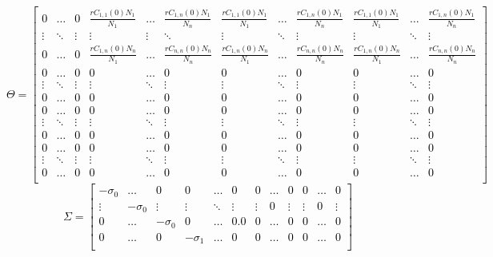 \documentclass[10pt,onecolumn,twoside,lineno]{pnas-new}
\begin{document}
\textcolor{black}{
\begin{equation}
    \Theta = 
\begin{bmatrix}
0 & \dots & 0  & \frac{r C_{1,1}(0)N_1}{N_1} & \dots &\frac{r C_{1,n}(0)N_1}{N_n} &  \frac{r C_{1,1}(0)N_1}{N_1} & \dots & \frac{r C_{1,n}(0)N_1}{N_n} &  \frac{r C_{1,1}(0)N_1}{N_1} & \dots & \frac{r C_{1,n}(0)N_1}{N_n}  \\
\vdots & \ddots  & \vdots & \vdots & \vdots & \ddots  & \vdots & \ddots & \vdots  & \vdots & \ddots & \vdots \\
0 & \dots & 0 & \frac{r C_{1,n}(0)N_n}{N_1} & \dots & \frac{r C_{n,n}(0)N_n}{N_n}  & \frac{ r C_{1,n}(0)N_n}{N_1} & \dots & \frac{r C_{n,n}(0)N_n}{N_n} & \frac{ r C_{1,n}(0)N_n}{N_1} & \dots & \frac{r C_{n,n}(0)N_n}{N_n} \\ 
0 & \dots & 0  & 0 & \dots & 0  & 0 & \dots & 0 & 0 & \dots & 0  \\
\vdots & \ddots & \vdots & \vdots &  \ddots & \vdots & \vdots & \ddots & \vdots & \vdots & \ddots & \vdots\\
0 & \dots & 0  & 0 & \dots &  0  & 0 & \dots & 0  & 0 & \dots & 0 \\ 
0 & \dots & 0  &  0 & \dots & 0  & 0 & \dots & 0  & 0 & \dots & 0 \\
\vdots & \ddots & \vdots & \vdots & \ddots & \vdots & \vdots & \ddots & \vdots  & \vdots & \ddots & \vdots\\
0 & \dots & 0  & 0 & \dots & 0  & 0 & \dots &  0 & 0 & \dots &  0 \\ 
0 & \dots & 0  &  0 & \dots & 0  & 0 & \dots & 0  & 0 & \dots & 0 \\
\vdots & \ddots & \vdots & \vdots & \ddots & \vdots & \vdots & \ddots & \vdots  & \vdots & \ddots & \vdots\\
0 & \dots & 0  & 0 & \dots & 0  & 0 & \dots &  0 & 0 & \dots &  0 \\ 
\end{bmatrix}
\label{Teqn}
\end{equation}
\begin{equation}
    \Sigma = 
\begin{bmatrix}
-\sigma_0 & \dots & 0  &  0 &\dots & 0  & 0 & \dots & 0   & 0 & \dots & 0  \\
\vdots & -\sigma_0  & \vdots & \vdots &  \ddots & \vdots & \vdots &0 & \vdots & \vdots &0 & \vdots\\
0 & \dots &-\sigma_0  & 0 & \dots & 0.0 & 0 & \dots & 0 & 0 & \dots & 0  \\ 
0 & \dots & 0 & -\sigma_1 & \dots & 0  & 0 & \dots & 0  & 0 & \dots & 0  \\

\end{bmatrix}
\end{equation}}
\end{document}
